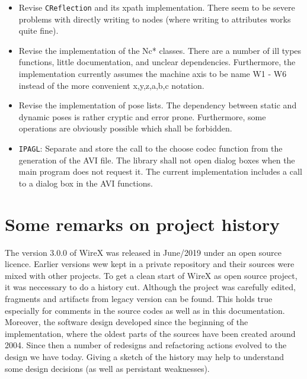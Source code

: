 \documentclass[11pt,a4paper,onepage,openany]{book}
\begin{document}
\begin{itemize}
\item Revise \texttt{CReflection} and its xpath implementation. There seem to
    be severe problems with directly writing to nodes (where writing to
    attributes works quite fine).

\item Revise the implementation of the Nc* classes. There are a number of ill
    types functions, little documentation, and unclear dependencies.
    Furthermore, the implementation currently assumes the machine axis to be
    name W1 - W6 instead of the more convenient x,y,z,a,b,c notation.

\item Revise the implementation of pose lists. The dependency between static
    and dynamic poses is rather cryptic and error prone. Furthermore, some
    operations are obviously possible which shall be forbidden.

\item \texttt{IPAGL}: Separate and store the call to the choose codec
    function from the generation of the AVI file. The library shall not open
    dialog boxes when the main program does not request it. The current
    implementation includes a call to a dialog box in the AVI functions.
\end{itemize}

\section{Some remarks on project history}\label{sec:ProjectHistory}%
The version 3.0.0 of WireX was released in June/2019 under an open source licence.
Earlier versions wew kept in a private repository and their sources
were mixed with other projects. To get a clean start of WireX as open source project,
it was neccessary to do a history cut. Although the project was carefully edited, fragments
and artifacts from legacy version can be found. This holds true especially for comments in 
the source codes as well as in this documentation. Moreover, the software design
developed since the beginning of the implementation, where the oldest parts of the sources
have been created around 2004. Since then a number of redesigns and refactoring actions 
evolved to the design we have today. Giving a sketch of the history may help to understand
some design decisions (as well as persistant weaknesses).
\end{document}
